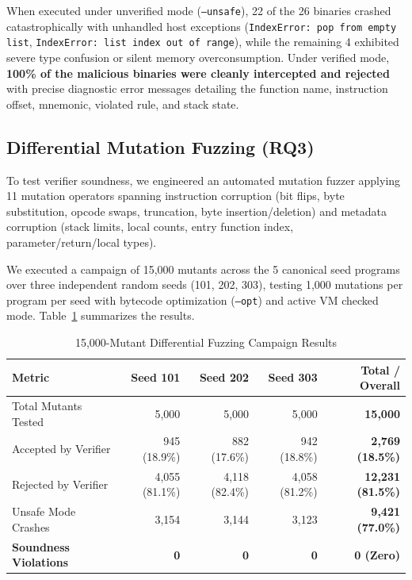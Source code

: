 \documentclass[conference]{IEEEtran}
\begin{document}
When executed under unverified mode (\texttt{--unsafe}), 22 of the 26 binaries crashed catastrophically with unhandled host exceptions (\texttt{IndexError: pop from empty list}, \texttt{IndexError: list index out of range}), while the remaining 4 exhibited severe type confusion or silent memory overconsumption. Under verified mode, \textbf{100\% of the malicious binaries were cleanly intercepted and rejected} with precise diagnostic error messages detailing the function name, instruction offset, mnemonic, violated rule, and stack state.

\subsection{Differential Mutation Fuzzing (RQ3)}
To test verifier soundness, we engineered an automated mutation fuzzer applying 11 mutation operators spanning instruction corruption (bit flips, byte substitution, opcode swaps, truncation, byte insertion/deletion) and metadata corruption (stack limits, local counts, entry function index, parameter/return/local types).

We executed a campaign of 15,000 mutants across the 5 canonical seed programs over three independent random seeds (101, 202, 303), testing 1,000 mutations per program per seed with bytecode optimization (\texttt{--opt}) and active VM checked mode. Table~\ref{tab:fuzz_summary} summarizes the results.

\begin{table}[htbp]
\caption{15,000-Mutant Differential Fuzzing Campaign Results}
\label{tab:fuzz_summary}
\centering
\begin{tabular}{lrrrr}
\toprule
\textbf{Metric} & \textbf{Seed 101} & \textbf{Seed 202} & \textbf{Seed 303} & \textbf{Total / Overall} \\
\midrule
Total Mutants Tested & 5,000 & 5,000 & 5,000 & \textbf{15,000} \\
Accepted by Verifier & 945 (18.9\%) & 882 (17.6\%) & 942 (18.8\%) & \textbf{2,769 (18.5\%)} \\
Rejected by Verifier & 4,055 (81.1\%) & 4,118 (82.4\%) & 4,058 (81.2\%) & \textbf{12,231 (81.5\%)} \\
Unsafe Mode Crashes  & 3,154 & 3,144 & 3,123 & \textbf{9,421 (77.0\%)} \\
\textbf{Soundness Violations} & \textbf{0} & \textbf{0} & \textbf{0} & \textbf{0 (Zero)} \\
\bottomrule
\end{tabular}
\end{table}
\end{document}
